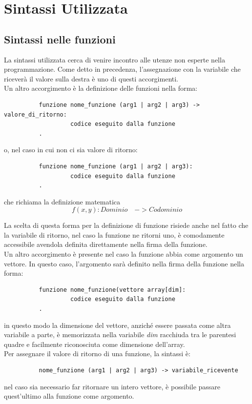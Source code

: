 \documentclass[11pt, a4paper, twoside, notitlepage]{report}
\begin{document}
\section{Sintassi Utilizzata}
\label{sintassi}
\subsection{Sintassi nelle funzioni}
La sintassi utilizzata cerca di venire incontro alle utenze non esperte nella
programmazione. Come detto in precedenza, l'assegnazione con la variabile che
riceverà il valore sulla destra è uno di questi accorgimenti.
\\Un altro accorgimento è la definizione delle funzioni nella forma:


\begin{verbatim}
          funzione nome_funzione (arg1 | arg2 | arg3) -> valore_di_ritorno:
                   codice eseguito dalla funzione
          .
\end{verbatim}

o, nel caso in cui non ci sia valore di ritorno:

\begin{verbatim}
          funzione nome_funzione (arg1 | arg2 | arg3):
                   codice eseguito dalla funzione
          .
\end{verbatim}


che richiama la definizione matematica
\[ f(x,y): Dominio \quad -> Codominio\]

La scelta di questa forma per la definizione di funzione risiede anche nel fatto
che la variabile di ritorno, nel caso la funzione ne ritorni uno, è comodamente
accessibile avendola definita direttamente nella firma della funzione.
\\Un altro accorgimento è presente nel caso la funzione abbia come argomento un
vettore. In questo caso, l'argomento sarà definito nella firma della funzione
nella forma:

\begin{verbatim}
          funzione nome_funzione(vettore array[dim]:
                   codice eseguito dalla funzione
          .
\end{verbatim}

in questo modo la dimensione del vettore, anziché essere passata come
altra variabile a parte, è memorizzata nella variabile \emph{dim} racchiuda tra
le parentesi quadre e facilmente riconosciuta come dimensione dell'array.
\\Per assegnare il valore di ritorno di una funzione, la sintassi è:
\begin{verbatim}
          nome_funzione (arg1 | arg2 | arg3) -> variabile_ricevente
\end{verbatim}
nel caso sia necessario far ritornare un intero vettore, è possibile passare
quest'ultimo alla funzione come argomento.
\end{document}
